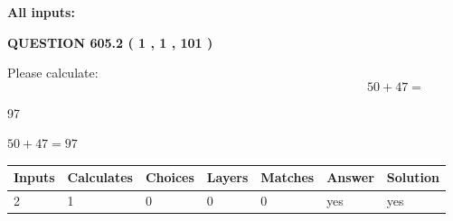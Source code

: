 \documentclass[12pt]{article}
\begin{document}
   
   
   
\noindent{}
   
   
   
   
\noindent\vspace{0.1in}\hspace{-0.08in} {\textbf{\Large{All inputs: }}}
   
   
  
\vspace{0.2in}
  
{\textbf{\Large{QUESTION
605.2 
 ( 1 , 1 , 101 )
}}}
  
  
 
Please calculate:
\begin{equation}
50 +  %
47 = \nonumber
\end{equation}
 
 
 
\noindent{}
 
 

97
 
 
\noindent{}
 
 

 
 
 
\noindent{}
 
 

$ %
50 +  %
47=   %
97$
 
 
\noindent{}
 
 

 
   
   
   
   
\noindent\begin{tabular}{|l|l|l|l|l|l|l|}
 \hline
Inputs & Calculates & Choices & Layers & Matches & Answer & Solution \\ \hline
 2  & 
 1  & 
 0
  & 
 0  & 
 0  & 
  yes & 
  yes 
  \\ \hline
 \end{tabular}
   
   
   
   
\noindent{}
   
\end{document}
